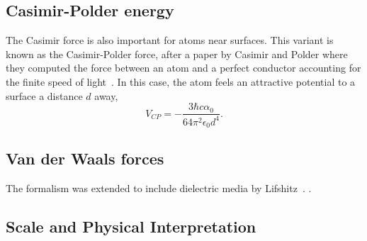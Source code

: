 \subsection{Casimir-Polder energy}

The Casimir force is also important for atoms near surfaces.  This variant is known as the Casimir-Polder force, after a paper by Casimir and Polder where they computed the force between an atom and a perfect conductor accounting for the finite speed of light~\cite{CasimirPolder1948}.  
In this case, the atom feels an attractive potential to a surface a distance $d$ away,
\begin{equation}
V_{CP} =-\frac{3\hbar c\alpha_0}{64\pi^2\epsilon_0 d^4}.
\end{equation}


\subsection{Van der Waals forces}

The formalism was extended to include dielectric media by Lifshitz~\cite{Lifshitz1956}.  .  



\subsection{Scale and Physical Interpretation}

